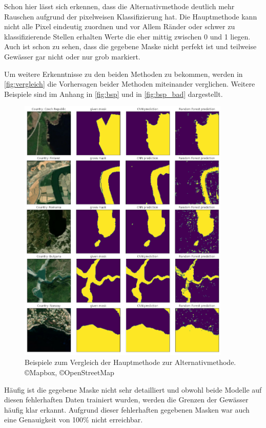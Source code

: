 Schon hier lässt sich erkennen, dass die Alternativmethode deutlich mehr Rauschen aufgrund der pixelweisen Klassifizierung hat.
Die Hauptmethode kann nicht alle Pixel eindeutig zuordnen und vor Allem Ränder oder schwer zu klassifizierende Stellen erhalten Werte die eher mittig zwischen 0 und 1 liegen.
Auch ist schon zu sehen, dass die gegebene Maske nicht perfekt ist und teilweise Gewässer gar nicht oder nur grob markiert.

Um weitere Erkenntnisse zu den beiden Methoden zu bekommen, werden in \autoref{fig:vergleich} die Vorhersagen beider Methoden miteinander verglichen.
Weitere Beispiele sind im Anhang in \autoref{fig:bsp} und in \autoref{fig:bsp_bad} dargestellt.

\begin{figure}
    \centering
    \includegraphics[width=0.9\textwidth]{images/vergleich.png}
    \caption{Beispiele zum Vergleich der Hauptmethode zur Alternativmethode.\\ \copyright Mapbox, \copyright OpenStreetMap}
    \label{fig:vergleich}
\end{figure}

Häufig ist die gegebene Maske nicht sehr detailliert 
und obwohl beide Modelle auf diesen fehlerhaften Daten trainiert wurden,
werden die Grenzen der Gewässer häufig klar erkannt.
Aufgrund dieser fehlerhaften gegebenen Masken war auch eine Genauigkeit von 100\% nicht erreichbar.

